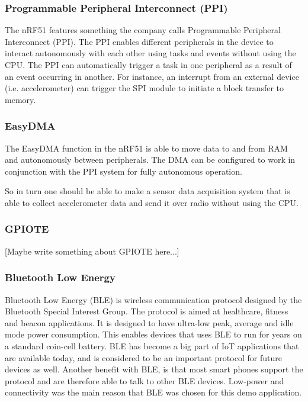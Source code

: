 \subsubsection{Programmable Peripheral Interconnect (PPI)}

The nRF51 features something the company calls Programmable Peripheral Interconnect (PPI). The PPI enables different peripherals in the device to interact autonomously with each other using tasks and events without using the CPU. The PPI can automatically trigger a task in one peripheral as a result of an event occurring in another. For instance, an interrupt from an external device (i.e. accelerometer) can trigger the SPI module to initiate a block transfer to memory. 

\subsubsection{EasyDMA}

The EasyDMA function in the nRF51 is able to move data to and from RAM and autonomously between peripherals. The DMA can be configured to work in conjunction with the PPI system for fully autonomous operation.

So in turn one should be able to make a sensor data acquisition system that is able to collect accelerometer data and send it over radio without using the CPU.

\subsubsection{GPIOTE}

[Maybe write something about GPIOTE here...]

\subsubsection{Bluetooth Low Energy}

Bluetooth Low Energy (BLE) is wireless communication protocol designed by the Bluetooth Special Interest Group. The protocol is aimed at healthcare, fitness and beacon applications. It is designed to have ultra-low peak, average and idle mode power consumption. This enables devices that uses BLE to run for years on a standard coin-cell battery. BLE has become a big part of IoT applications that are available today, and is considered to be an important protocol for future devices as well. Another benefit with BLE, is that most smart phones support the protocol and are therefore able to talk to other BLE devices. Low-power and connectivity was the main reason that BLE was chosen for this demo application. 

